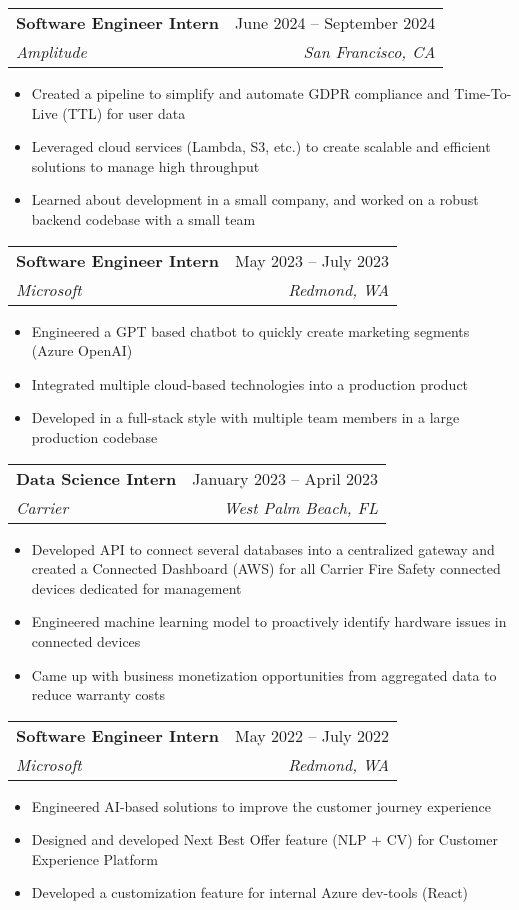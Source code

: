 \documentclass[letterpaper,11pt]{article}
\makeatletter
\newcommand{\resumeItem}[1]{
  \item\small{
    {#1 \vspace{-2pt}}
  }
}
\newcommand{\resumeSubheading}[4]{
  \vspace{-2pt}\item
    \begin{tabular*}{0.97\textwidth}[t]{l@{\extracolsep{\fill}}r}
      \textbf{#1} & #2 \\
      \textit{\small#3} & \textit{\small #4} \\
    \end{tabular*}\vspace{-7pt}
}
\newcommand{\resumeItemListStart}{\begin{itemize}}
\newcommand{\resumeItemListEnd}{\end{itemize}\vspace{-5pt}}
\makeatother
\begin{document}

    \resumeSubheading
      {Software Engineer Intern}{June 2024 -- September 2024}
      {Amplitude}{San Francisco, CA}
      \resumeItemListStart
        \resumeItem{Created a pipeline to simplify and automate GDPR compliance and Time-To-Live (TTL) for user data}
        \resumeItem{Leveraged cloud services (Lambda, S3, etc.) to create scalable and efficient solutions to manage high throughput}
        \resumeItem{Learned about development in a small company, and worked on a robust backend codebase with a small team}
      \resumeItemListEnd
      
    \resumeSubheading
      {Software Engineer Intern}{May 2023 -- July 2023}
      {Microsoft}{Redmond, WA}
      \resumeItemListStart
        \resumeItem{Engineered a GPT based chatbot to quickly create marketing segments (Azure OpenAI)}
        \resumeItem{Integrated multiple cloud-based technologies into a production product}
        \resumeItem{Developed in a full-stack style with multiple team members in a large production codebase}
      \resumeItemListEnd
    
    \resumeSubheading
      {Data Science Intern}{January 2023 -- April 2023}
      {Carrier}{West Palm Beach, FL}
      \resumeItemListStart
        \resumeItem{Developed API to connect several databases into a centralized gateway and created a Connected Dashboard (AWS) for all Carrier Fire Safety connected devices dedicated for management}
        \resumeItem{Engineered machine learning model to proactively identify hardware issues in connected devices}
        \resumeItem{Came up with business monetization opportunities from aggregated data to reduce warranty costs}
      \resumeItemListEnd
        
    \resumeSubheading
      {Software Engineer Intern}{May 2022 -- July 2022}
      {Microsoft}{Redmond, WA}
      \resumeItemListStart
        \resumeItem{Engineered AI-based solutions to improve the customer journey experience}
        \resumeItem{Designed and developed Next Best Offer feature (NLP + CV) for Customer Experience Platform}
        \resumeItem{Developed a customization feature for internal Azure dev-tools (React)}
    \resumeItemListEnd
    
\end{document}

